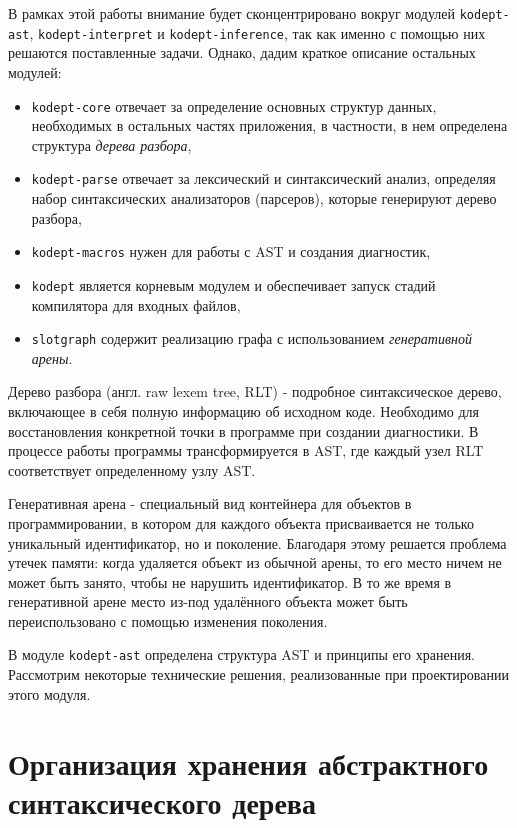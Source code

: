 В рамках этой работы внимание будет сконцентрировано вокруг модулей \lstinline{kodept-ast}, \lstinline{kodept-interpret} и \lstinline{kodept-inference}, так как именно с помощью них решаются поставленные задачи.
Однако, дадим краткое описание остальных модулей:
\begin{itemize}
    \item \lstinline{kodept-core} отвечает за определение основных структур данных, необходимых в остальных частях приложения, в частности, в нем определена структура \textit{дерева разбора},
    \item \lstinline{kodept-parse} отвечает за лексический и синтаксический анализ, определяя набор синтаксических анализаторов (парсеров), которые генерируют дерево разбора,
    \item \lstinline{kodept-macros} нужен для работы с AST и создания диагностик,
    \item \lstinline{kodept} является корневым модулем и обеспечивает запуск стадий компилятора для входных файлов,
    \item \lstinline{slotgraph} содержит реализацию графа с использованием \textit{генеративной арены}.
\end{itemize}

Дерево разбора (англ. raw lexem tree, RLT) - подробное синтаксическое дерево, включающее в себя полную информацию об исходном коде.
Необходимо для восстановления конкретной точки в программе при создании диагностики.
В процессе работы программы трансформируется в AST, где каждый узел RLT соответствует определенному узлу AST.

Генеративная арена - специальный вид контейнера для объектов в программировании, в котором для каждого объекта присваивается не только уникальный идентификатор, но и поколение.
Благодаря этому решается проблема утечек памяти: когда удаляется объект из обычной арены, то его место ничем не может быть занято, чтобы не нарушить идентификатор.
В то же время в генеративной арене место из-под удалённого объекта может быть переиспользовано с помощью изменения поколения.

В модуле \lstinline{kodept-ast} определена структура AST и принципы его хранения.
Рассмотрим некоторые технические решения, реализованные при проектировании этого модуля.


\section{Организация хранения абстрактного синтаксического дерева}
\label{sec:ast_structure}

